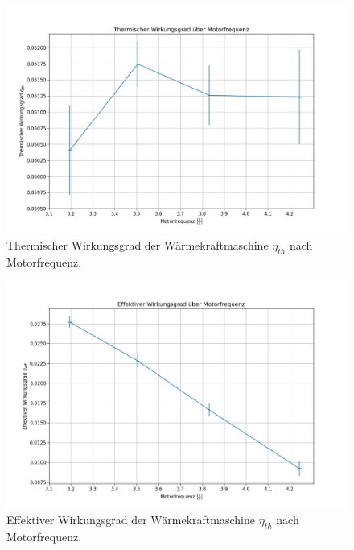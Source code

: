 \begin{figure}[H]
    \centering
    \includegraphics[width=.9\textwidth]{files/eta_th_freq.png}
    \caption{Thermischer Wirkungsgrad der Wärmekraftmaschine $\eta_{th}$ nach Motorfrequenz.}
    \label{fig:eta_th_freq}
\end{figure}


\begin{figure}[H]
    \centering
    \includegraphics[width=.9\textwidth]{files/eta_eff_freq.png}
    \caption{Effektiver Wirkungsgrad der Wärmekraftmaschine $\eta_{th}$ nach Motorfrequenz.}
    \label{fig:eta_eff_freq}
\end{figure}
